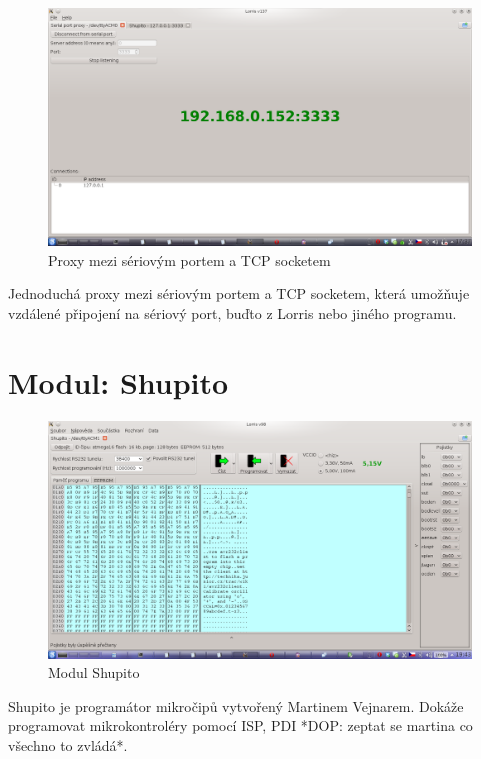 \documentclass[12pt, a4paper, oneside]{article}
\begin{document}
\begin{figure}[h]
\begin{center}
\includegraphics[width=\textwidth]{img/proxy.png}
\caption{Proxy mezi sériovým portem a TCP socketem}
\label{Shupito}
\end{center}
\end{figure}
Jednoduchá proxy mezi sériovým portem a TCP socketem, která umožňuje vzdálené připojení na sériový port, buďto z Lorris nebo jiného programu.


\newpage
\setlength{\voffset}{0mm} %
\pagestyle{plain}

\section*{Modul: Shupito}

\begin{figure}[h]
\begin{center}
\includegraphics[width=\textwidth]{img/shupito.png}
\caption{Modul Shupito}
\label{Shupito}
\end{center}
\end{figure}
Shupito je programátor mikročipů vytvořený Martinem Vejnarem. Dokáže programovat mikrokontroléry pomocí ISP, PDI *DOP: zeptat se martina co všechno to zvládá*. 
\end{document}
